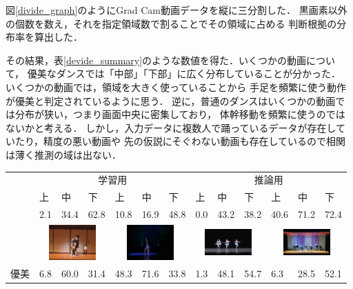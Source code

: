 図\ref{divide_graph}のようにGrad Cam動画データを縦に三分割した．
黒画素以外の個数を数え，それを指定領域数で割ることでその領域に占める
判断根拠の分布率を算出した．

その結果，表\ref{devide_summary}のような数値を得た．いくつかの動画について，
優美なダンスでは「中部」「下部」に広く分布していることが分かった．
いくつかの動画では，領域を大きく使っていることから
手足を頻繁に使う動作が優美と判定されているように思う．
逆に，普通のダンスはいくつかの動画では分布が狭い，つまり画面中央に密集しており，
体幹移動を頻繁に使うのではないかと考える．
しかし，入力データに複数人で踊っているデータが存在していたり，精度の悪い動画や
先の仮説にそぐわない動画も存在しているので相関は薄く推測の域は出ない．

\begin{table}[t]
  \begin{center}
    \begin{tabular}{|c|p{5mm}p{5mm}p{5mm}|p{5mm}p{5mm}p{5mm}|p{5mm}p{5mm}p{5mm}|p{5mm}p{5mm}p{5mm}|} \hline
        & \multicolumn{6}{|c|}{学習用} & \multicolumn{6}{|c|}{推論用} \\ \cline{2-13}
        &上 &中 &下 &上 &中 &下 &上 &中 &下 &上 &中 &下 \\ \hline
        &2.1 &34.4 &62.8 &10.8 &16.9 &48.8 &0.0 &43.2 &38.2 &40.6 &71.2 &72.4 \\
        & \multicolumn{3}{|c|}{\includegraphics[width=18mm]{images/snaps/japanese_elegant.png}}
        & \multicolumn{3}{|c|}{\includegraphics[width=18mm]{images/snaps/chinese_elegant.png}}
        & \multicolumn{3}{|c|}{\includegraphics[width=18mm]{images/snaps/ballet_group_elegant.png}}
        & \multicolumn{3}{|c|}{\includegraphics[width=18mm]{images/snaps/japanese_group_elegant.png}}
      \\ \cline{2-13}
      優美
        &6.8 &60.0 &31.4 &48.3 &71.6 &33.8 &1.3 &48.1 &54.7 &6.3 &28.5 &52.1 \\

\end{tabular}
\end{center}
\end{table}
